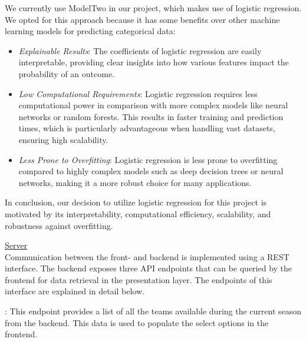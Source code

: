 \documentclass[conference,a4paper,flushend]{cs-techrep}
\begin{document}
We currently use ModelTwo in our project, which makes use of logistic regression. We opted for this approach because it has some benefits over other machine learning models for predicting categorical data:
\begin{itemize}
    \item \textit{Explainable Results}: The coefficients of logistic regression are easily interpretable, providing clear insights into how various features impact the probability of an outcome. 
    \item \textit{Low Computational Requirements}: Logistic regression requires less computational power in comparison with more complex models like neural networks or random forests. This results in faster training and prediction times, which is particularly advantageous when handling vast datasets, ensuring high scalability. 
    \item \textit{Less Prone to Overfitting}: Logistic regression is less prone to overfitting compared to highly complex models such as deep decision trees or neural networks, making it a more robust choice for many applications. 
\end{itemize}

In conclusion, our decision to utilize logistic regression for this project is motivated by its interpretability, computational efficiency, scalability, and robustness against overfitting. 

\vspace{0.15cm}
\underline{Server}\vspace{0.1cm}\\
Communication between the front- and backend is implemented using a REST interface. The backend exposes three API endpoints that can be queried by the frontend for data retrieval in the presentation layer. The endpoints of this interface are explained in detail below.

: This endpoint provides a list of all the teams available during the current season from the backend. This data is used to populate the select options in the frontend.

\end{document}
